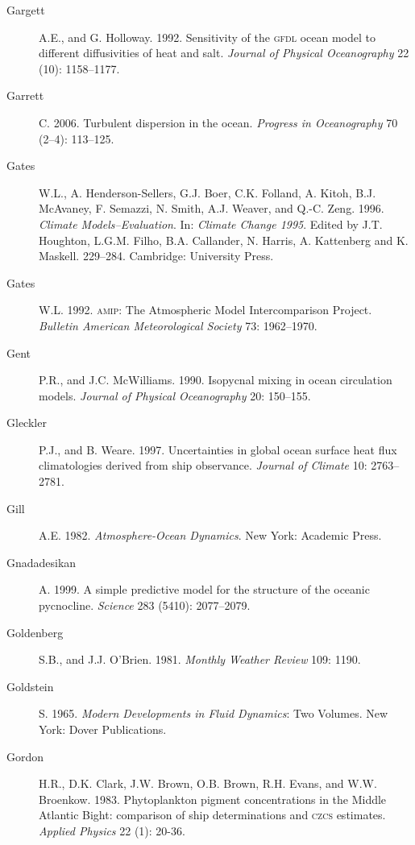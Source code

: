 \begin{description}
\item[Gargett]A.E., and G. Holloway. 1992. Sensitivity of the
  \textsc{gfdl} ocean model to different diffusivities of heat and
  salt. \textit{Journal of Physical Oceanography} 22 (10): 1158--1177.

\item [Garrett]C. 2006. Turbulent dispersion in the
  ocean. \textit{Progress in Oceanography} 70 (2--4): 113--125.

\item[Gates]W.L., A. Henderson-Sellers, G.J. Boer, C.K. Folland,
  A. Kitoh, B.J. McAvaney, F. Semazzi, N. Smith, A.J. Weaver, and
  Q.-C. Zeng. 1996. \textit{Climate Models--Evaluation}. In:
  \textit{Climate Change 1995}. Edited by J.T. Houghton, L.G.M. Filho,
  B.A. Callander, N. Harris, A. Kattenberg and K.
  Maskell. 229--284. Cambridge: University Press.

\item [Gates]W.L. 1992. \textsc{amip}: The Atmospheric Model
  Intercomparison Project.  \textit{Bulletin American Meteorological
    Society} 73: 1962--1970.

\item[Gent]P.R., and J.C. McWilliams. 1990. Isopycnal mixing in ocean
  circulation models. \textit{Journal of Physical Oceanography} 20:
  150--155.

\item [Gleckler]P.J., and B. Weare. 1997. Uncertainties in global
  ocean surface heat flux climatologies derived from ship
  observance. \textit{Journal of Climate} 10: 2763--2781.

\item [Gill]A.E. 1982. \textit{Atmosphere-Ocean Dynamics}. New York:
  Academic Press.

\item [Gnadadesikan]A. 1999. A simple predictive model for the
  structure of the oceanic pycnocline. \textit{Science} 283 (5410):
  2077--2079.

\item [Goldenberg]S.B., and J.J. O'Brien. 1981. \textit{Monthly
  Weather Review} 109: 1190.

\item [Goldstein]S. 1965. \textit{Modern Developments in Fluid
  Dynamics}: Two Volumes. New York: Dover Publications.

\item [Gordon]H.R., D.K. Clark, J.W. Brown, O.B. Brown, R.H. Evans,
  and W.W.  Broenkow. 1983. Phytoplankton pigment concentrations in
  the Middle Atlantic Bight: comparison of ship determinations and
  \textsc{czcs} estimates. \textit{Applied Physics} 22 (1): 20-36.


\end{description}
